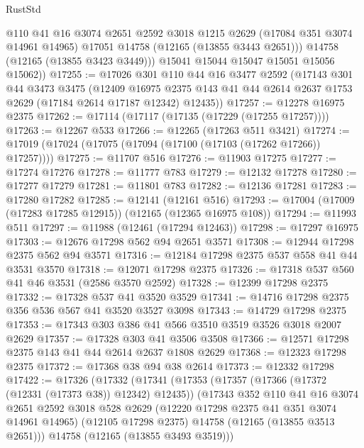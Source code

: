 \begin{lexlean}{RustStd}
\begin{coremodule}
            @110
            @41
            @16
            @3074
            @2651
            @2592
            @3018
            @1215
            @2629
            (@17084 @351 @3074 @14961 @14965)
            @17051
            @14758
            (@12165 (@13855 @3443 @2651)))
          @14758
          (@12165 (@13855 @3423 @3449)))
        @15041
        @15044
        @15047
        @15051
        @15056
        @15062))
@17255 := @17026
    @301
    @110
    @44
    @16
    @3477
    @2592
    (@17143
      @301
      @44
      @3473
      @3475
      (@12409
        @16975
        @2375
        @143
        @41
        @44
        @2614
        @2637
        @1753
        @2629
        (@17184 @2614 @17187 @12342)
        @12435))
@17257 := @12278 @16975 @2375
@17262 := @17114 (@17117 (@17135 (@17229 (@17255 @17257))))
@17263 := @12267 @533
@17266 := @12265 (@17263 @511 @3421)
@17274 := @17019 (@17024 (@17075 (@17094 (@17100 (@17103 (@17262 @17266)) @17257))))
@17275 := @11707 @516
@17276 := @11903 @17275
@17277 := @17274 @17276
@17278 := @11777 @783
@17279 := @12132 @17278
@17280 := @17277 @17279
@17281 := @11801 @783
@17282 := @12136 @17281
@17283 := @17280 @17282
@17285 := @12141 (@12161 @516)
@17293 := @17004 (@17009 (@17283 @17285 @12915)) (@12165 (@12365 @16975 @108))
@17294 := @11993 @511
@17297 := @11988 (@12461 (@17294 @12463))
@17298 := @17297 @16975
@17303 := @12676 @17298 @562 @94 @2651 @3571
@17308 := @12944 @17298 @2375 @562 @94 @3571
@17316 := @12184 @17298 @2375 @537 @558 @41 @44 @3531 @3570
@17318 := @12071 @17298 @2375
@17326 := @17318 @537 @560 @41 @46 @3531 (@2586 @3570 @2592)
@17328 := @12399 @17298 @2375
@17332 := @17328 @537 @41 @3520 @3529
@17341 := @14716 @17298 @2375 @356 @536 @567 @41 @3520 @3527 @3098
@17343 := @14729 @17298 @2375
@17353 := @17343 @303 @386 @41 @566 @3510 @3519 @3526 @3018 @2007 @2629
@17357 := @17328 @303 @41 @3506 @3508
@17366 := @12571 @17298 @2375 @143 @41 @44 @2614 @2637 @1808 @2629
@17368 := @12323 @17298 @2375
@17372 := @17368 @38 @94 @38 @2614
@17373 := @12332 @17298
@17422 := @17326
    (@17332
      (@17341
        (@17353
          (@17357 (@17366 (@17372 (@12331 (@17373 @38)) @12342) @12435))
          (@17343
            @352
            @110
            @41
            @16
            @3074
            @2651
            @2592
            @3018
            @528
            @2629
            (@12220 @17298 @2375 @41 @351 @3074 @14961 @14965)
            (@12105 @17298 @2375)
            @14758
            (@12165 (@13855 @3513 @2651)))
          @14758
          (@12165 (@13855 @3493 @3519)))

\end{coremodule}
\end{lexlean}
